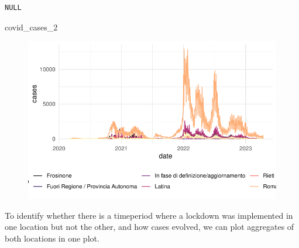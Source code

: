 \documentclass[
  letterpaper,
  DIV=11,
  numbers=noendperiod]{scrreprt}
\newenvironment{Shaded}{\begin{snugshade}}{\end{snugshade}}
\newcommand{\NormalTok}[1]{\textcolor[rgb]{0.00,0.23,0.31}{#1}}
\begin{document}
\begin{verbatim}
NULL
\end{verbatim}

\begin{Shaded}
\begin{Highlighting}[]
\NormalTok{covid\_cases\_2}
\end{Highlighting}
\end{Shaded}

\begin{figure}[H]

{\centering \includegraphics{longitudinal-2_files/figure-pdf/unnamed-chunk-7-2.pdf}

}

\end{figure}

To identify whether there is a timeperiod where a lockdown was
implemented in one location but not the other, and how cases evolved, we
can plot aggregates of both locations in one plot.
\end{document}
